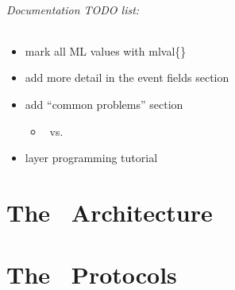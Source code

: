 \documentclass[11pt]{article}
\begin{document}
\paragraph{Documentation TODO list:}
\begin{itemize}
\item mark all ML values with mlval\{\}
\item add more detail in the event fields section
\item add ``common problems'' section
\begin{itemize}
\item \EInit\ vs. \EView
\end{itemize}
\item layer programming tutorial
\end{itemize}

\newpage
\part{The \ensemble\ Architecture}









\newpage
\part{The \ensemble\ Protocols}

\appendix



\end{document}
